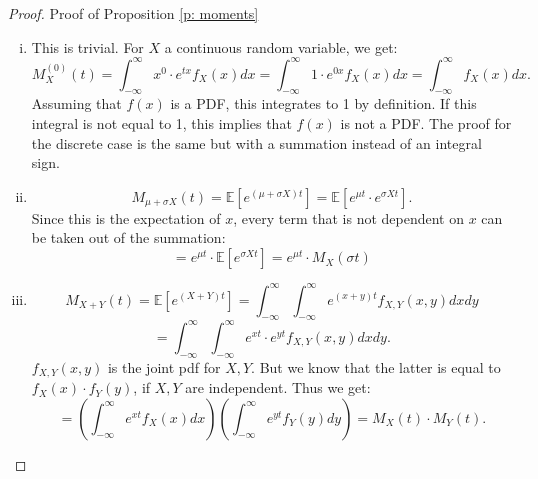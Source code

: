 \begin{proof}
    Proof of Proposition \ref{p: moments}
    \begin{enumerate}[(i)]
        \item This is trivial. For \(X\) a continuous random variable, we get: 
        \[ M_X^{(0)}(t) = \int_{-\infty}^{\infty} x^0 \cdot e^{t x } f_X(x) dx = \int_{-\infty}^{\infty} 1 \cdot e^{0 x } f_X(x) dx = \int_{-\infty}^{\infty} f_X(x) dx.\] Assuming that \(f(x)\) is a PDF, this integrates to 1 by definition. If this integral is not equal to 1, this implies that \(f(x)\) is not a PDF. The proof for the discrete case is the same but with a summation instead of an integral sign.
        \item \[M_{\mu + \sigma X}(t) = \mathbb{E}[e^{(\mu + \sigma X)t}] = \mathbb{E}[e^{\mu t} \cdot e^{\sigma X t}].\] Since this is the expectation of \(x\), every term that is not dependent on \(x\) can be taken out of the summation:
        \[ = e^{\mu t} \cdot \mathbb{E}[e^{\sigma X t}] = e^{\mu t} \cdot M_{ X}(\sigma t)\]
        \item 
        \[M_{X+Y}(t) = \mathbb{E}[e^{(X + Y)t}] = \int_{-\infty}^{\infty} \int_{-\infty}^{\infty} e^{(x + y)t} f_{X, Y}(x, y) dx dy\] 
        \[= \int_{-\infty}^{\infty} \int_{-\infty}^{\infty} e^{xt} \cdot e^{yt} f_{X, Y}(x, y) dx dy.\] 
        \(f_{X, Y}(x, y)\) is the joint pdf for \(X, Y\). But we know that the latter is equal to \(f_X(x) \cdot f_Y(y)\), if \(X, Y\) are independent. Thus we get:
        \[ = \left(\int_{-\infty}^{\infty}  e^{xt} f_X(x) dx\right) \left(\int_{-\infty}^{\infty}  e^{yt} f_Y(y) dy\right) = M_X(t) \cdot M_Y(t).\] 
    \end{enumerate}
\end{proof}

